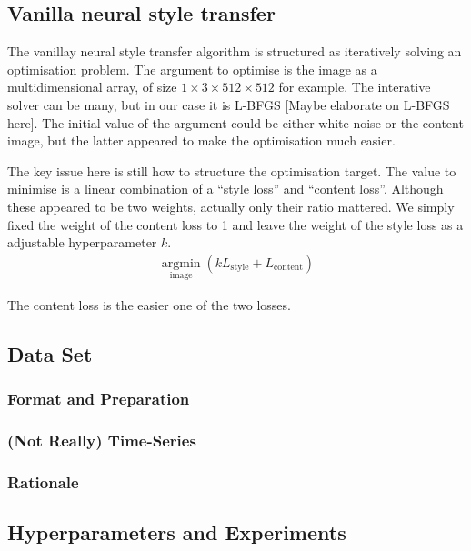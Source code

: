\documentclass[runningheads]{llncs}
\DeclareMathOperator*{\argmin}{argmin}
\begin{document}
\subsection{Vanilla neural style transfer}

The vanillay neural style transfer algorithm \cite{nst} is 
structured as iteratively solving an optimisation problem.
The argument to optimise is the image as a multidimensional array,
of size $1\times3\times512\times512$ for example.
The interative solver can be many, but in our case it is 
L-BFGS [Maybe elaborate on L-BFGS here]. 
The initial value of the argument could be either white noise or the content image,
but the latter appeared to make the optimisation much easier.

The key issue here is still how to structure the optimisation target.
The value to minimise is a linear combination of a ``style loss'' 
and ``content loss''.
Although these appeared to be two weights,
actually only their ratio mattered.
We simply fixed the weight of the content loss to 1 and
leave the weight of the style loss as a adjustable hyperparameter $k$.
\begin{align}
\argmin\limits_{\text{image}} (kL_\text{style}+L_\text{content})
\end{align}

The content loss is the easier one of the two losses.

\subsection{Data Set}

\subsubsection {Format and Preparation}

\subsubsection {(Not Really) Time-Series}

\subsubsection {Rationale}

\subsection{Hyperparameters and Experiments}
\end{document}
